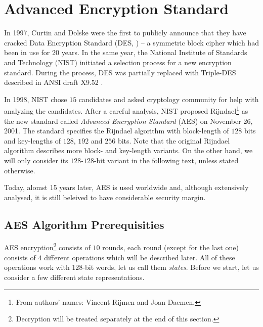 \section{Advanced Encryption Standard}
\label{sec:aes}

In 1997, Curtin and Dolske were the first to publicly announce \cite{curtin1998brute} that they have cracked Data Encryption Standard (DES, \cite{fips1977des}) -- a symmetric block cipher which had been in use for $20$ years. In the same year, the National Institute of Standards and Technology (NIST) initiated a selection process for a new encryption standard. During the process, DES was partially replaced with Triple-DES described in ANSI draft X9.52 \cite{americantripple}.

In 1998, NIST chose $15$ candidates and asked cryptology community for help with analyzing the candidates. After a careful analysis, NIST proposed Rijndael\footnote{From authors' names: Vincent Rijmen and Joan Daemen.} \cite{daemen1999aes} as the new standard called {\em Advanced Encryption Standard} (AES) \cite{fips2001aes} on November 26, 2001. The standard specifies the Rijndael algorithm with block-length of $128$ bits and key-lengths of $128$, $192$ and $256$ bits. Note that the original Rijndael algorithm \cite{daemen2013rijndael} describes more block- and key-length variants. On the other hand, we will only consider its $128$-$128$-bit variant in the following text, unless stated otherwise.

Today, alomst 15 years later, AES is used worldwide and, although extensively analysed, it is still beleived to have considerable security margin.



\subsection{AES Algorithm Prerequisities}

AES encryption\footnote{Decryption will be treated separately at the end of this section.} consists of $10$ rounds, each round (except for the last one) consists of $4$ different operations which will be described later. All of these operations work with $128$-bit words, let us call them {\em states}. Before we start, let us consider a few different state representations. 

